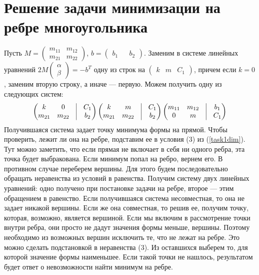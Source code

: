 \documentclass[pdftex,ptm,12pt,a4paper]{report}
\begin{document}
\section{Решение задачи минимизации на ребре многоугольника}
  Пусть $M = \begin{pmatrix} m_{11} & m_{12} \\ m_{21} & m_{22} \end{pmatrix}$, 
        $b = \begin{pmatrix} b_1 && b_2 \end{pmatrix}$. 
  Заменим в системе линейных уравнений $2M \begin{pmatrix} \alpha \\ \beta \end{pmatrix} = - b^T$ одну из строк на $\begin{pmatrix} k & m & C_1 \end{pmatrix}$,
  причем если $k=0$, заменим вторую строку, а иначе --- первую.
  Можем получить одну из следующих систем:
  \[
    \begin{pmatrix} 
      k & 0 & \vrule & C_1 \\
      m_{21} & m_{22} & \vrule & b_2
    \end{pmatrix} 
    \begin{pmatrix} 
      k & m & \vrule & C_1 \\
      m_{21} & m_{22} & \vrule & b_2
    \end{pmatrix} 
    \begin{pmatrix} 
      m_{11} & m_{12} & \vrule & b_1 \\
      0 & m & \vrule & C_1 
    \end{pmatrix} 
  \]
  Получившаяся система задает точку минимума формы на прямой.
  Чтобы проверить, лежит ли она на ребре, подставим ее в условия (3) из (\ref{task1dim}).
  Тут можно заметить, что если прямая не включает в себя ни одного ребра, эта точка будет выбракована.
  Если минимум попал на ребро, вернем его.
  В противном случае переберем вершины.
  Для этого будем последовательно обращать неравенства из условий в равенства.
  Получим систему двух линейных уравнений: одно получено при постановке задачи на ребре, второе --- этим обращением в равенство.
  Если получившаяся система несовместная, то она не задает никакой вершины. 
  Если же она совместная, то решив ее, получим точку, которая, возможно, является вершиной.
  Если мы включим в рассмотрение точки внутри ребра, они просто не дадут значения формы меньше, вершины.
  Поэтому необходимо из возможных вершин исключить те, что не лежат на ребре.
  Это можно сделать подстановкой в неравенства (3).
  Из оставшихся выберем то, для которой значение формы наименьшее.
  Если такой точки не нашлось, результатом будет ответ о невозможности найти минимум на ребре.
\end{document}
